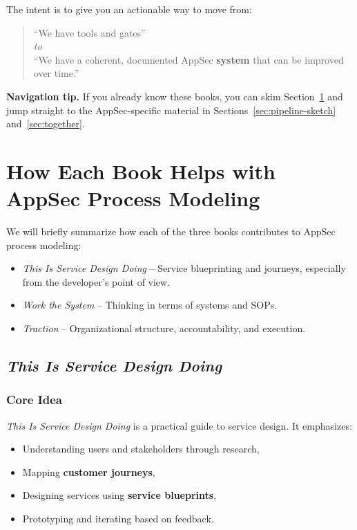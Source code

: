 \documentclass[11pt]{article}
\begin{document}
The intent is to give you an actionable way to move from:
\begin{quote}
  ``We have tools and gates''\\
  \emph{to}\\
  ``We have a coherent, documented AppSec \textbf{system} that can be
  improved over time.''
\end{quote}

\medskip

\textbf{Navigation tip.} If you already know these books, you can skim Section~\ref{sec:books} and jump straight to the AppSec-specific material in Sections~\ref{sec:pipeline-sketch} and~\ref{sec:together}.

\clearpage
\section{How Each Book Helps with AppSec Process Modeling}
\label{sec:books}

We will briefly summarize how each of the three books contributes
to AppSec process modeling:

\begin{itemize}
  \item \emph{This Is Service Design Doing} -- Service blueprinting
        and journeys, especially from the developer's point of view.
  \item \emph{Work the System} -- Thinking in terms of systems and SOPs.
  \item \emph{Traction} -- Organizational structure, accountability,
        and execution.
\end{itemize}

\subsection{\emph{This Is Service Design Doing}}
\subsubsection*{Core Idea}

\emph{This Is Service Design Doing} is a practical guide to
service design. It emphasizes:

\begin{itemize}
  \item Understanding users and stakeholders through research,
  \item Mapping \textbf{customer journeys},
  \item Designing services using \textbf{service blueprints},
  \item Prototyping and iterating based on feedback.
\end{itemize}
\end{document}
